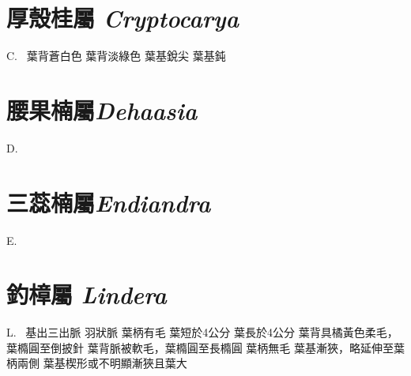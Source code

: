\documentclass[12pt,a4paper]{article}
\begin{document}
\section{厚殼桂屬 \textit{Cryptocarya}}

\begin{Key*}{C.~} 
\indent\alter 葉背蒼白色
\alter 葉背淡綠色
    \alter 葉基銳尖
    \alter 葉基鈍
\end{Key*}



\section{腰果楠屬\textit{Dehaasia}}
\begin{Key*}{D.~}
\indent\alter
{}
\end{Key*}

\section{三蕊楠屬\textit{Endiandra}}
\begin{Key*}{E.~}
\indent\alter
{}
\end{Key*}

\section{釣樟屬 \textit{Lindera}}
\begin{Key*}{L.~}
\indent\alter 基出三出脈
\alter 羽狀脈
    \alter 葉柄有毛
        \alter 葉短於4公分
        \alter 葉長於4公分
            \alter 葉背具橘黃色柔毛，葉橢圓至倒披針
            \alter 葉背脈被軟毛，葉橢圓至長橢圓
    \alter 葉柄無毛 
        \alter 葉基漸狹，略延伸至葉柄兩側%
        \alter 葉基楔形或不明顯漸狹且葉大
\end{Key*}
\end{document}
